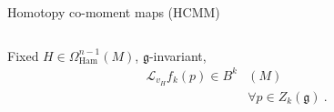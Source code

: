 \documentclass[beamer,10pt]{standalone}
\begin{document}
\begin{frame}[shrink]{Homotopy co-moment maps (HCMM)}
\begin{columns}
			\begin{column}{.375\textwidth}
				\begin{propblock}
					Fixed $H\in \Omega^{n-1}_{\text{Ham}}(M)$, $\mathfrak{g}$-invariant,
					\begin{displaymath}
					\begin{split}
						\mathcal{L}_{v_H} f_k(p) \in B^k&(M) \\
						& \forall p \in Z_k(\mathfrak{g}) ~.
					\end{split}
					\end{displaymath}
				\end{propblock}
			\end{column}
		\end{columns}

\end{frame}
\end{document}
